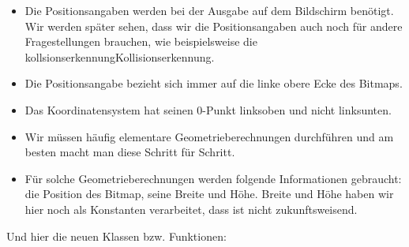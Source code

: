 \begin{itemize}
    \item Die Positionsangaben werden bei der Ausgabe auf dem Bildschirm benötigt. Wir werden später sehen, dass wir die Positionsangaben auch noch für andere Fragestellungen brauchen, wie beispielsweise die \Gls{kollsionserkennung}Kollisionserkennung.

    \item Die Positionsangabe bezieht sich immer auf die linke obere Ecke des Bitmaps. 

    \item Das Koordinatensystem hat seinen 0-Punkt linksoben und nicht linksunten.

    \item Wir müssen häufig elementare Geometrieberechnungen durchführen und am besten macht man diese Schritt für Schritt.

    \item Für solche Geometrieberechnungen werden folgende Informationen gebraucht: die Position des Bitmap, seine Breite und Höhe. Breite und Höhe haben wir hier noch als Konstanten verarbeitet, dass ist nicht zukunftsweisend.
\end{itemize}

Und hier die neuen Klassen bzw. Funktionen:

